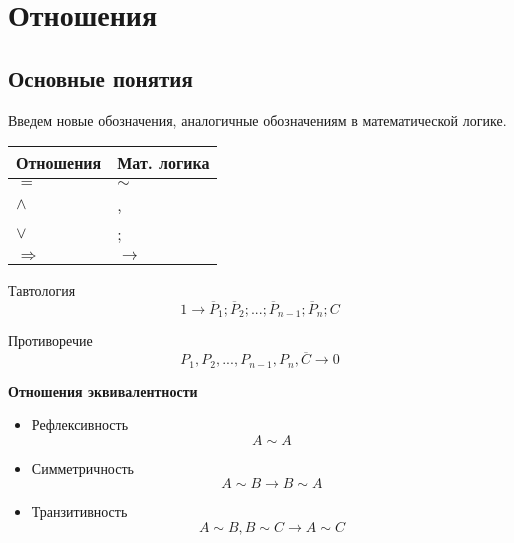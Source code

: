 \chapter{Отношения}
\section{Основные понятия}
Введем новые обозначения, аналогичные обозначениям в математической логике.


\begin{table}[h]
    \centering
    \begin{tabular}[c]{ | l | l | }
        \hline
        Отношения & Мат. логика \\ \hline
        $=$ & $\sim$   \\ \hline
        $\land$ & ,     \\ \hline
        $\lor$ &  ;    \\ \hline
        $\Rightarrow$ & $\to$ \\
        \hline
    \end{tabular}
\end{table}

Тавтология
\begin{equation}
    1 \to \overline P_1; \overline P_2; ... ; \overline P_{n-1}; \overline P_{n}; C
\end{equation}

Противоречие
\begin{equation}
    P_1, P_2, ..., P_{n-1}, P_n, \overline C \to 0
\end{equation}

\textbf{Отношения эквивалентности}
\begin{itemize}
    \item Рефлексивность
    \begin{equation}
        A \sim A
    \end{equation}

    \item Симметричность 
    \begin{equation}
        A \sim B \to B \sim A
    \end{equation}

    \item Транзитивность
    \begin{equation}
        A \sim B, B \sim C \to A \sim C
    \end{equation}
\end{itemize}

